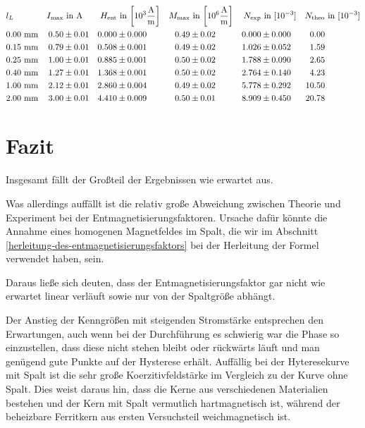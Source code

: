 \documentclass[12pt,a4paper]{scrartcl}
\numberwithin{equation}{section} %
\renewcommand{\[}{} %
\renewcommand{\]}{\noindent} %
\begin{document}
\begin{table}
\begin{align*}
	&l_L &
	I_\mathrm{max} &\text{ in } \mathrm A &
	H_\mathrm{ent} &\text{ in }
	{\tiny \left[ 10^3 \frac{\mathrm A}{\mathrm m} \right] } &
	M_\mathrm{max} &\text{ in }
	{\tiny \left[ 10^6 \frac{\mathrm A}{\mathrm m} \right] } &
	N_\mathrm{exp} &\text{ in } [10^{-3}] &
	N_\mathrm{theo} &\text{ in } [10^{-3}]
	\\
	&0.00 \ \mathrm{mm} &
	0.50 &\pm 0.01 &
	0.000 &\pm 0.000 &
	0.49 &\pm 0.02 &
	0.000 &\pm 0.000 &
	0.00\\
	&0.15 \ \mathrm{mm} &
	0.79 &\pm 0.01 &
	0.508 &\pm 0.001 &
	0.49 &\pm 0.02 &
	1.026 &\pm 0.052 &
	1.59\\
	&0.25 \ \mathrm{mm} &
	1.00 &\pm 0.01 &
	0.885 &\pm 0.001 &
	0.50 &\pm 0.02 &
	1.788 &\pm 0.090 &
	2.65\\
	&0.40 \ \mathrm{mm} &
	1.27 &\pm 0.01 &
	1.368 &\pm 0.001 &
	0.50 &\pm 0.02 &
	2.764 &\pm 0.140 &
	4.23\\
	&1.00 \ \mathrm{mm} &
	2.12 &\pm 0.01 &
	2.860 &\pm 0.004 &
	0.49 &\pm 0.02 &
	5.778 &\pm 0.292 &
	10.50\\
	&2.00 \ \mathrm{mm} &
	3.00 &\pm 0.01 &
	4.410 &\pm 0.009 &
	0.50 &\pm 0.01 &
	8.909 &\pm 0.450 &
	20.78
\end{align*}
\caption{Entmagnetisierungsfaktor}
\label{Tab: Entmagnetisierung}
\end{table}

\clearpage
\hypertarget{fazit}{%
\section{Fazit}\label{fazit}}

Insgesamt fällt der Großteil der Ergebnissen wie erwartet aus.

Was allerdings auffällt ist die relativ große Abweichung zwischen Theorie und Experiment bei der Entmagnetisierungsfaktoren. Ursache dafür könnte die Annahme eines homogenen Magnetfeldes im Spalt, die wir im Abschnitt \ref{herleitung-des-entmagnetisierungsfaktors} bei der Herleitung der Formel verwendet haben, sein.

Daraus ließe sich deuten, dass der Entmagnetisierungsfaktor gar nicht wie erwartet linear verläuft sowie nur von der Spaltgröße abhängt.

Der Anstieg der Kenngrößen mit steigenden Stromstärke entsprechen den Erwartungen, auch wenn bei der Durchführung es schwierig war die Phase so einzustellen, dass diese nicht stehen bleibt oder rückwärts läuft und man genügend gute Punkte auf der Hysterese erhält. Auffällig bei der Hyteresekurve mit Spalt ist die sehr große Koerzitivfeldstärke im Vergleich zu der Kurve ohne Spalt. Dies weist daraus hin, dass die Kerne aus verschiedenen Materialien bestehen und der Kern mit Spalt vermutlich hartmagnetisch ist, während der beheizbare Ferritkern aus ersten Versuchsteil weichmagnetisch ist.
\end{document}
